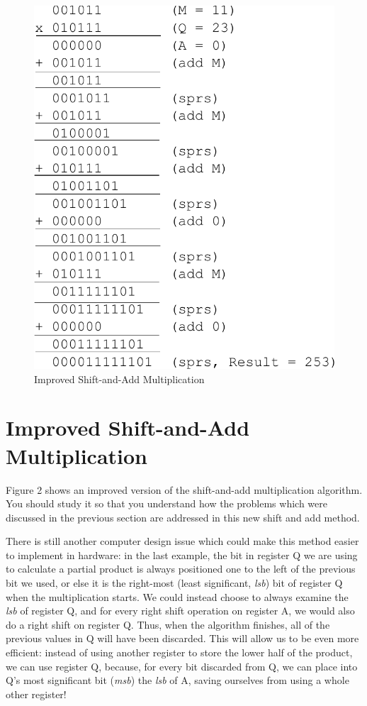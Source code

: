 \documentclass{article}
\begin{document}
\begin{figure}
\centering
\includegraphics[scale=0.7]{isaam2.pdf}
\caption{Improved Shift-and-Add Multiplication}
\end{figure}

\section{Improved Shift-and-Add Multiplication}
Figure 2 shows an improved version of the shift-and-add multiplication algorithm.
You should study it so that you understand how the problems which were discussed in the previous section are addressed in this new shift and add method.

There is still another computer design issue which could make this method easier to implement in hardware: in the last example, the bit in register Q we are using to calculate a partial product is always positioned one to the left of the previous bit we used, or else it is the right-most (least significant, \emph{lsb}) bit of register Q when the multiplication starts.
We could instead choose to always examine the \emph{lsb} of register Q, and for every right shift operation on register A, we would also do a right shift on register Q.
Thus, when the algorithm finishes, all of the previous values in Q will have been discarded.
This will allow us to be even more efficient: instead of using another register to store the lower half of the product, we can use register Q, because, for every bit discarded from Q, we can place into Q's most significant bit (\emph{msb}) the \emph{lsb} of A, saving ourselves from using a whole other register!
\end{document}

